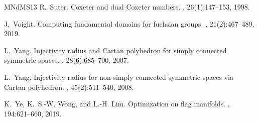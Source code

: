 \documentclass[11pt,twoside]{amsart}
\theoremstyle{plain}
\begin{document}
\begin{thebibliography}{MNdMS13}
R.~Suter.
\newblock Coxeter and dual {C}oxeter numbers.
, 26(1):147--153, 1998.

J.~Voight.
\newblock Computing fundamental domains for fuchsian groups.
, 21(2):467--489,
  2019.

L.~Yang.
\newblock Injectivity radius and {C}artan polyhedron for simply connected
  symmetric spaces.
, 28(6):685--700, 2007.

L.~Yang.
\newblock Injectivity radius for non-simply connected symmetric spaces via
  {C}artan polyhedron.
, 45(2):511--540, 2008.

K.~Ye, K.~S.-W. Wong, and L.-H. Lim.
\newblock Optimization on flag manifolds.
, 194:621--660, 2019.

\end{thebibliography}
\fi
\end{document}
